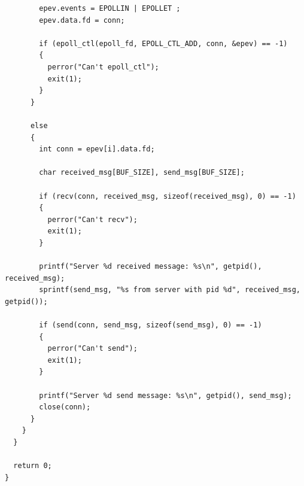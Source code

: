 \begin{lstlisting}
        epev.events = EPOLLIN | EPOLLET ;
        epev.data.fd = conn;

        if (epoll_ctl(epoll_fd, EPOLL_CTL_ADD, conn, &epev) == -1)
        {
          perror("Can't epoll_ctl");
          exit(1);
        }
      }

      else
      {
        int conn = epev[i].data.fd;

        char received_msg[BUF_SIZE], send_msg[BUF_SIZE];

        if (recv(conn, received_msg, sizeof(received_msg), 0) == -1)
        {
          perror("Can't recv");
          exit(1);
        }

        printf("Server %d received message: %s\n", getpid(), received_msg);
        sprintf(send_msg, "%s from server with pid %d", received_msg, getpid());

        if (send(conn, send_msg, sizeof(send_msg), 0) == -1)
        {
          perror("Can't send");
          exit(1);
        }

        printf("Server %d send message: %s\n", getpid(), send_msg);
        close(conn);
      }
    }
  }

  return 0;
}
\end{lstlisting}